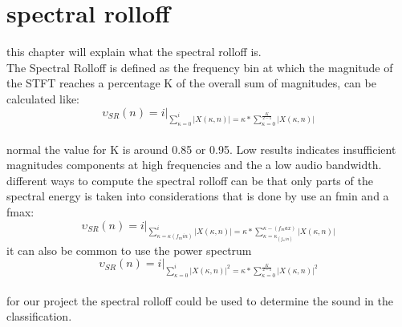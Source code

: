 \section{spectral rolloff}
this chapter will explain what the spectral rolloff is.\\
The Spectral Rolloff is defined as the frequency bin at which the magnitude of the STFT reaches a percentage K of the overall sum of magnitudes, can be calculated like:\\
\begin{equation}\label{ eq:normal spectral rolloff}
	\upsilon_{SR}(n) = i \vert _{\sum_{\kappa = 0}^i \vert X(\kappa, n) \vert = \kappa * \sum_{\kappa = 0}^ {\frac{K}{2-1}}\vert X(\kappa, n) \vert}
\end{equation}
\\
normal the value for K is around 0.85 or 0.95. Low results indicates insufficient magnitudes components at high frequencies and the a low audio bandwidth.\\
different ways to compute the spectral rolloff can be that only parts of the spectral energy is taken into considerations that is done by use an fmin and a fmax:
\begin{equation}\label{ eq: fmin and fmax spectral rolloff}
	\upsilon_{SR}(n) = i \vert _{\sum_{\kappa = \kappa(f_min)}^i \vert X(\kappa, n) \vert = \kappa * \sum_{\kappa = \kappa_(f_min)}^ {\kappa-(f_max)}\vert X(\kappa, n) \vert}
\end{equation}
it can also be common to use the power spectrum
\begin{equation}\label{ eq:power spectral rolloff}
	\upsilon_{SR}(n) = i \vert _{\sum_{\kappa = 0}^i \vert X(\kappa, n) \vert^2 = \kappa * \sum_{\kappa = 0}^ {\frac{K}{2-1}}\vert X(\kappa, n) \vert^2}
\end{equation}
\\
for our project the spectral rolloff could be used to determine the sound in the classification.